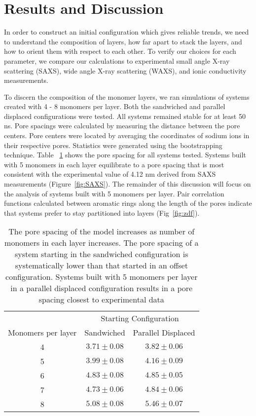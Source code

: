 \section*{Results and Discussion}

In order to construct an initial configuration which gives reliable 
trends, we need to understand the composition of layers, how far apart
to stack the layers, and how to orient them with respect to each other.
To verify our choices for each parameter, we compare our calculations
to experimental small angle X-ray scattering (SAXS), wide angle X-ray
scattering (WAXS), and ionic conductivity measurements.

To discern the composition of the monomer layers, we ran simulations of 
systems created with 4 - 8 monomers per layer. Both the sandwiched and 
parallel displaced configurations were tested. All systems remained
stable for at least 50 ns. Pore spacings were calculated by measuring
the distance between the pore centers. Pore centers were located by
averaging the coordinates of sodium ions in their respective pores. 
Statistics were generated using the bootstrapping technique. Table
~\ref{table:p2p} shows the pore spacing for all systems tested.
Systems built with 5 monomers in each layer equilibrate to a pore
spacing that is most consistent with the experimental value of 4.12 nm
derived from SAXS measurements (Figure~\ref{fig:SAXS}). The remainder of
this discussion will focus on the analysis of systems built with 5 
monomers per layer. Pair correlation functions calculated between 
aromatic rings along the length of the pores indicate that systems
prefer to stay partitioned into layers (Fig~\ref{fig:zdf}).

\begin{table}
\centering
\begin{tabular}{|c|c|c|}
\toprule
                   & \multicolumn{2}{c}{Starting Configuration} \\
Monomers per layer & Sandwiched & Parallel Displaced \\
\midrule
4 & $3.71 \pm 0.08$ & $3.82 \pm 0.06$ \\
5 & $3.99 \pm 0.08$ & $4.16 \pm 0.09$ \\
6 & $4.83 \pm 0.08$ & $4.85 \pm 0.05$ \\
7 & $4.73 \pm 0.06$ & $4.84 \pm 0.06$ \\
8 & $5.08 \pm 0.08$ & $5.46 \pm 0.07$ \\
\bottomrule
\end{tabular}
\caption{The pore spacing of the model increases as number of monomers
in each layer increases. The pore spacing of a system starting in the 
sandwiched configuration is systematically lower than that started in an 
offset configuration. Systems built with 5 monomers per layer in a parallel
displaced configuration results in a pore spacing closest to experimental
data}\label{table:p2p} 
\end{table}

